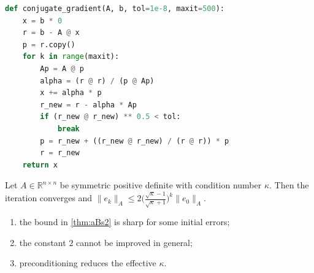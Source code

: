 \begin{lstlisting}[language=python,caption={Reference implementation for aBs2.},label={lst:aBs2}]
def conjugate_gradient(A, b, tol=1e-8, maxit=500):
    x = b * 0
    r = b - A @ x
    p = r.copy()
    for k in range(maxit):
        Ap = A @ p
        alpha = (r @ r) / (p @ Ap)
        x += alpha * p
        r_new = r - alpha * Ap
        if (r_new @ r_new) ** 0.5 < tol:
            break
        p = r_new + ((r_new @ r_new) / (r @ r)) * p
        r = r_new
    return x
\end{lstlisting}

\lipsum[66-66]
\begin{theorem}\label{thm:aBs2}
Let $A\in\mathbb{R}^{n\times n}$ be symmetric positive definite with condition number $\kappa$. Then the iteration converges and
$\lVert e_k\rVert_A \le 2\bigl(\tfrac{\sqrt\kappa-1}{\sqrt\kappa+1}\bigr)^k\lVert e_0\rVert_A$.
\end{theorem}
\begin{enumerate}[label=(\roman*)]
\item the bound in \cref{thm:aBs2} is sharp for some initial errors;
\item the constant $2$ cannot be improved in general;
\item preconditioning reduces the effective $\kappa$.
\end{enumerate}

\lipsum[54-54]
